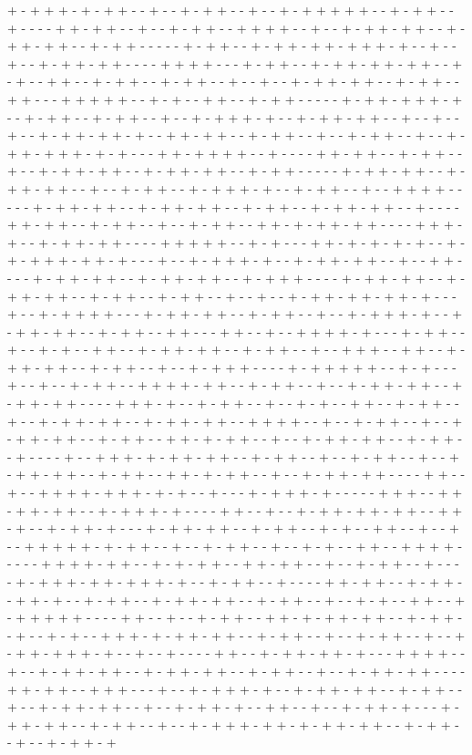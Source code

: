 + - + + + - + - + + - - + - - + - + + - - + - - + - + + + + + - - + - + + - - + - - - - + + - + + - - + - - + - + + - - + + + + - - + - - + - + + - + + - - + - + + - + + - - + - + + - - - - - + - + + - - + - + + - + + - + + + - + - - + - - + - - + - + + - + + - - - - + + + + - - - + - + + - - + - + + - + + - + + - - + - + - - + + - - + - + + - - + - + + - - + - - + - - + - + + - + + - - + - + + - - + + - - - + + + + + - - + - + - - + + - - + - + + - - - - - + - + + - + + + - + - - + - + + - - + - + + - - + - - + - + + + - + - - + - + + - + + - - + - - + - - + - - + - + + - + + - + - - + + - + + - - + - + + - - + - - + - + + - - + - - + - + + - + + + - + - + - - - + + - + + + + - - + - - - - + + - + + - - + - + + - - + - - + - + + - + + - - + - + + - + + - - + - + + - - - - - + - + + - + + - - + - + + - + + - - + - - + - + + - - + - + + + - + - - + - + + - - + - - + + + + - - - - - + - + + - + + - - + - + + - + + - - + - + + - - + - + + - + + - - + - - - - + + - + + - - + - + + - - + - - + - + + - - + + - + - + + - + + - - - - + + + - + - - + - + + - + + - - - - + + + + + - - + - + - - - + + - + - + - + - + - - + - + - + + + - + + - + - - - + - - + - + + + - + - - + - + + - + + - - + - - + + - - - - + - + + - + + - - + - + + - + + - - + - + + + - - - - + - + + - + + - - + - + + - + + - - + - + + - - + - + + - - + - - + - - + - + + - + + - + + - + - - - + - - + - + + + + - - - + - + + - + + - - + - + + - - + - - + - + + + - + - - + - + + - + + - - + - + + - - + + - - - + + - - + - - + + + + - + - - - + - + + - - + - - + - + - - + + - - + - + + - + + - - + - + + - - + - - + + + - - + + - - + - + + - + + - - + - + + - - + - - + - + + + - - - - + - + + + + + - - + - + - - - + - - + - - + - + + - - + + + + - + + - - + - + + - - + - - + - + + - + + - - + - + + - + + - - - - + + + - + - - + - + + - - + - - + - + - - + + - - + - + + - - + - - + - + + - + + - - + - + + - + + - - + + + + - - + - - + - + + - - + - - + - + + - + + - - + - + + - - + + - + - + + - - + - - + - + + - + + - - + - + + - - + - - - - + - - + + + - + - + + - + + - - + - + + - - + - - + - + + - - + - - + - + + - + + - - + - + + - - + + - + - + + - - + - - + - + + - + + - - - - + + - - + - - + + + + - + + + - + - + - - + - - - + - + + + - + - - - - - + + + - - + + - + + - + + - - + - + + + - + - - - - + + - - + - - + - + + - + + - + + - - + + - + - - + - + + - + - - - + - + + - + + - - + - + + - - + - + - - + + - - + - - + - - + + + + + - + - + + - - + - - + - + + - - + - - + - + - - + + - - + + + + - - - - - + + + + - + + - - + - + - + + - - + + - + + - - + - - + - + + - - + - - - - + - + + + - + + - + + + - + - - + - + + - - + - - - - + + - + + - - + - + + - - + + - + - - + - + + - - + - + + - + + - - + - + + - - + - - + - + - - + + - - + - + + + + + - - - - + + - - + - - + - + + - - + + - + - + + - + + - - + - + + - - + - - + - + - - + + + - + - + + - + + - - + - + + - - + - - + - + + - - + - - + - + + - + + + - + - - + - - + - - - - + + - - + - + + - + + - + - - - + + + + - - + - - + - + + - + + - - + - + + - + + - - + - + + - - + - - + - + + - + + - - - - + + - + + - - + + + - - - + - - + - + + + - + - - + - + + - + + - - + - + + - - + - - + - + + - + + - - + - - + - + + - + - - + + - - + - - + - + + - + - - - + - + + - + + - - + - + + - - + - - + - + + + - + + - + - + + - + + - - + - + + - - + - - + - + + - + 